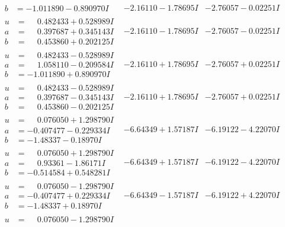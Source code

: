 \documentclass[1p]{elsarticle_modified}
\theoremstyle{definition}
\begin{document}
$$\begin{array}{c|c|c}
\begin{aligned}
b &= -1.011890 - 0.890970 I\end{aligned}
 & -2.16110 - 1.78695 I & -2.76057 - 0.02251 I \\ \hline\begin{aligned}
u &= \phantom{-}0.482433 + 0.528989 I \\
a &= \phantom{-}0.397687 + 0.345143 I \\
b &= \phantom{-}0.453860 + 0.202125 I\end{aligned}
 & -2.16110 - 1.78695 I & -2.76057 - 0.02251 I \\ \hline\begin{aligned}
u &= \phantom{-}0.482433 - 0.528989 I \\
a &= \phantom{-}1.058110 - 0.209584 I \\
b &= -1.011890 + 0.890970 I\end{aligned}
 & -2.16110 + 1.78695 I & -2.76057 + 0.02251 I \\ \hline\begin{aligned}
u &= \phantom{-}0.482433 - 0.528989 I \\
a &= \phantom{-}0.397687 - 0.345143 I \\
b &= \phantom{-}0.453860 - 0.202125 I\end{aligned}
 & -2.16110 + 1.78695 I & -2.76057 + 0.02251 I \\ \hline\begin{aligned}
u &= \phantom{-}0.076050 + 1.298790 I \\
a &= -0.407477 - 0.229334 I \\
b &= -1.48337 - 0.18970 I\end{aligned}
 & -6.64349 + 1.57187 I & -6.19122 - 4.22070 I \\ \hline\begin{aligned}
u &= \phantom{-}0.076050 + 1.298790 I \\
a &= \phantom{-}0.93361 - 1.86171 I \\
b &= -0.514584 + 0.548281 I\end{aligned}
 & -6.64349 + 1.57187 I & -6.19122 - 4.22070 I \\ \hline\begin{aligned}
u &= \phantom{-}0.076050 - 1.298790 I \\
a &= -0.407477 + 0.229334 I \\
b &= -1.48337 + 0.18970 I\end{aligned}
 & -6.64349 - 1.57187 I & -6.19122 + 4.22070 I \\ \hline\begin{aligned}
u &= \phantom{-}0.076050 - 1.298790 I \\

\end{aligned}
\end{array}$$
\end{document}
